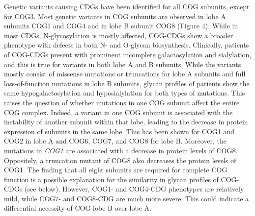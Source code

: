 Genetic variants causing CDGs have been identified for all COG subunits, except for COG3\cite{blackburn_maintaining_2019,reynders_how_2011,kodera_mutations_2015}. Most genetic variants in COG subunits are observed in lobe A subunits COG1 and COG4 and in lobe B subunit COG8 (Figure 4). While in most CDGs, N-glycosylation is mostly affected, COG-CDGs show a broader phenotype with defects in both N- and O-glycan biosynthesis\cite{reynders_how_2011}. Clinically, patients of COG-CDGs present with prominent incomplete galactosylation and sialylation\cite{reynders_how_2011,foulquier_conserved_2006}, and this is true for variants in both lobe A and B subunits. While the variants mostly consist of missense mutations or truncations for lobe A subunits and full loss-of-function mutations in lobe B subunits, glycan profiles of patients show the same hypogalactosylation and hyposialylation for both types of mutations\cite{palmigiano_maldi-ms_2017,abu_bakar_clinical_2018}. This raises the question of whether mutations in one COG subunit affect the entire COG complex. Indeed, a variant in one COG subunit is associated with the instability of another subunit within that lobe, leading to the decrease in protein expression of subunits in the same lobe\cite{foulquier_cog_2009}. This has been shown for COG1\cite{foulquier_conserved_2006} and COG2\cite{kodera_mutations_2015} in lobe A and COG6, COG7\cite{morava_common_2007,ng_molecular_2007}, and COG8\cite{kranz_cog8_2007} for lobe B. Moreover, the mutations in \emph{COG1} are associated with a decrease in protein levels of COG8\cite{foulquier_conserved_2006}. Oppositely, a truncation mutant of COG8 also decreases the protein levels of COG1\cite{foulquier_new_2007}. The finding that all eight subunits are required for complete COG function is a possible explanation for the similarity in glycan profiles of COG-CDGs (see below). However, COG1- and COG4-CDG phenotypes are relatively mild, while COG7- and COG8-CDG are much more severe. This could indicate a differential necessity of COG lobe B over lobe A.

\

